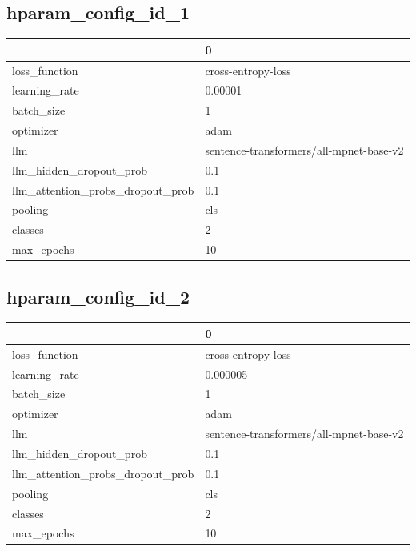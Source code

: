 \documentclass{article}
\begin{document}
\subsection{hparam\_config\_id\_1}
\begin{tabular}{ll}
\toprule
{} &                                        0 \\
\midrule
loss\_function                    &                       cross-entropy-loss \\
learning\_rate                    &                                  0.00001 \\
batch\_size                       &                                        1 \\
optimizer                        &                                     adam \\
llm                              &  sentence-transformers/all-mpnet-base-v2 \\
llm\_hidden\_dropout\_prob          &                                      0.1 \\
llm\_attention\_probs\_dropout\_prob &                                      0.1 \\
pooling                          &                                      cls \\
classes                          &                                        2 \\
max\_epochs                       &                                       10 \\
\bottomrule
\end{tabular}

\subsection{hparam\_config\_id\_2}
\begin{tabular}{ll}
\toprule
{} &                                        0 \\
\midrule
loss\_function                    &                       cross-entropy-loss \\
learning\_rate                    &                                 0.000005 \\
batch\_size                       &                                        1 \\
optimizer                        &                                     adam \\
llm                              &  sentence-transformers/all-mpnet-base-v2 \\
llm\_hidden\_dropout\_prob          &                                      0.1 \\
llm\_attention\_probs\_dropout\_prob &                                      0.1 \\
pooling                          &                                      cls \\
classes                          &                                        2 \\
max\_epochs                       &                                       10 \\
\bottomrule
\end{tabular}
\end{document}
